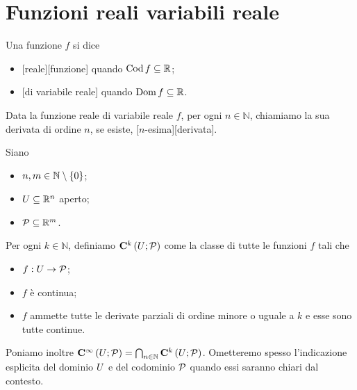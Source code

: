 \section{Funzioni reali variabili reale}
\label{CalcoloDifferenziale_FunzioniRealiDiVariabiliReale}
\begin{Definition}
	Una funzione $f$ si dice
	\begin{itemize}
		\item {}[reale][funzione] quando $\operatorname{Cod}{f} \subseteq \mathbb{R}$;
		\item {}[di variabile reale] quando $\operatorname{Dom}{f} \subseteq \mathbb{R}$.
	\end{itemize}
\end{Definition}
\begin{Definition}
	Data la funzione reale di variabile reale $f$, per ogni $n \in \mathbb{N}$, chiamiamo la sua derivata di ordine $n$, se esiste, [$n$-esima][derivata].
\end{Definition}
\begin{Definition}
	Siano
	\begin{itemize}
		\item $n, m \in \mathbb{N} \setminus \lbrace 0 \rbrace$;
		\item $U \subseteq \mathbb{R}^n$ aperto;
		\item $\mathcal{P} \subseteq \mathbb{R}^m$.
	\end{itemize}
	Per ogni $k \in \mathbb{N}$, definiamo $\CClass{k}[\Open][\Part]$ come la classe di tutte le funzioni $f$ tali che
	\begin{itemize}
		\item $f: U \rightarrow \mathcal{P}$;
		\item $f$ \`e continua;
		\item $f$ ammette tutte le derivate parziali di ordine minore o uguale a $k$ e esse sono tutte continue.
	\end{itemize}
	Poniamo inoltre $\CClass{\infty}[\Open][\Part] = \bigcap_{n \in \mathbb{N}} \CClass{k}[\Open][\Part]$. Ometteremo spesso l'indicazione esplicita del dominio $U$ e del codominio $\mathcal{P}$ quando essi saranno chiari dal contesto.
\end{Definition}
